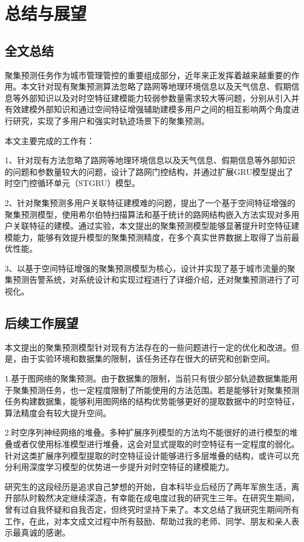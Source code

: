\documentclass[master]{thesis-uestc}
\begin{document}
\chapter{总结与展望}

\section{全文总结}
聚集预测任务作为城市管理管控的重要组成部分，近年来正发挥着越来越重要的作用。本文针对现有聚集预测算法忽略了路网等地理环境信息以及天气信息、假期信息等外部知识以及对时空特征建模能力较弱参数量需求较大等问题，分别从引入并有效建模外部知识和通过空间特征增强辅助建模多用户之间的相互影响两个角度进行研究，实现了多用户和强实时轨迹场景下的聚集预测。

本文主要完成的工作有：

1、针对现有方法忽略了路网等地理环境信息以及天气信息、假期信息等外部知识的问题和参数量较大的问题，设计了路网门控结构，并通过扩展GRU模型提出了时空门控循环单元（STGRU）模型。

2、针对聚集预测多用户关联特征建模难的问题，提出了一个基于空间特征增强的聚集预测模型，使用希尔伯特扫描算法和基于统计的路网结构嵌入方法实现对多用户关联特征的建模。通过实验，本文提出的聚集预测模型能够显著提升时空特征建模能力，能够有效提升模型的聚集预测精度，在多个真实世界数据上取得了当前最优性能。

3、以基于空间特征增强的聚集预测模型为核心，设计并实现了基于城市流量的聚集预测告警系统，对系统设计和实现过程进行了详细介绍，还对聚集预测进行了可视化。


\section{后续工作展望}
本文提出的聚集预测模型针对现有方法存在的一些问题进行一定的优化和改进。但是，由于实验环境和数据集的限制，该任务还存在很大的研究和创新空间。

1.基于图网络的聚集预测。由于数据集的限制，当前只有很少部分轨迹数据集能用于聚集预测任务，也一定程度限制了所能使用的方法范围。若是能够针对聚集预测任务构建数据集，能够利用图网络的结构优势能够更好的提取数据中的时空特征，算法精度会有较大提升空间。

2.时空序列神经网络的堆叠。多种扩展序列模型的方法均不能很好的进行模型的堆叠或者仅使用标准模型进行堆叠，这会对显式提取的时空特征有一定程度的弱化。针对这类扩展序列模型提取的时空特征设计能够进行多层堆叠的结构，或许可以充分利用深度学习模型的优势进一步提升对时空特征的建模能力。

\thesisacknowledgement
研究生的这段经历是追求自己梦想的开始，自本科毕业后经历了两年军旅生活，离开部队时毅然决定继续深造，有幸能在成电度过我的研究生三年。在研究生期间，曾有过自我怀疑和自我否定，但终究时坚持下来了。本文总结了我研究生期间所有工作，在此，对本文成文过程中所有鼓励、帮助过我的老师、同学、朋友和亲人表示最真诚的感谢。
\end{document}
